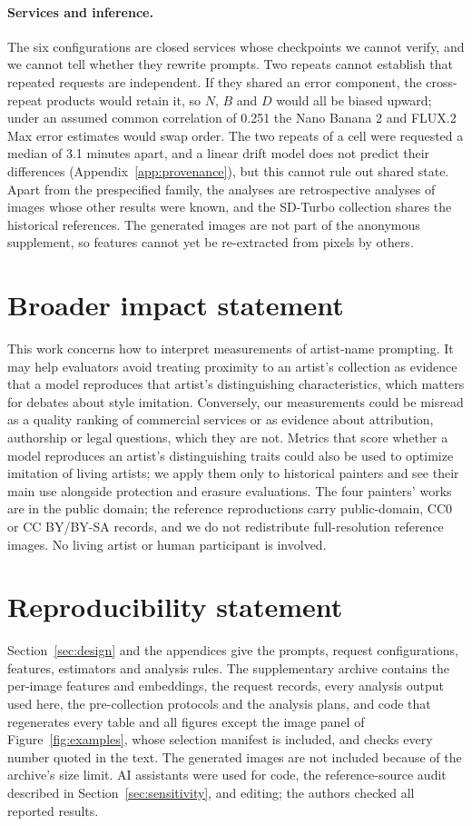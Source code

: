 \documentclass[10pt]{article}
\begin{document}
\paragraph{Services and inference.} The six configurations are closed services whose checkpoints
we cannot verify, and we cannot tell whether they rewrite prompts. Two repeats cannot establish that
repeated requests are independent. If they shared an error component, the cross-repeat products
would retain it, so $N$, $B$ and $D$ would all be biased upward; under an assumed common correlation
of 0.251 the Nano Banana 2 and FLUX.2 Max error estimates would swap order. The two repeats of a
cell were requested a median of 3.1 minutes apart, and a linear drift model does not predict their
differences (Appendix~\ref{app:provenance}), but this cannot rule out shared state. Apart from the
prespecified family, the analyses are retrospective analyses of images whose other results were
known, and the SD-Turbo collection shares the historical references. The generated images are not
part of the anonymous supplement, so features cannot yet be re-extracted from pixels by others.

\section*{Broader impact statement}
This work concerns how to interpret measurements of artist-name prompting. It may help evaluators
avoid treating proximity to an artist's collection as evidence that a model reproduces that artist's
distinguishing characteristics, which matters for debates about style imitation. Conversely, our
measurements could be misread as a quality ranking of commercial services or as evidence about
attribution, authorship or legal questions, which they are not. Metrics that score whether a model
reproduces an artist's distinguishing traits could also be used to optimize imitation of living
artists; we apply them only to historical painters and see their main use alongside protection
and erasure evaluations. The four painters' works are in the public domain; the reference
reproductions carry public-domain, CC0 or CC BY/BY-SA records, and we do not redistribute
full-resolution reference images. No living artist or human participant is involved.

\section*{Reproducibility statement}
Section~\ref{sec:design} and the appendices give the prompts, request configurations, features,
estimators and analysis rules. The supplementary archive contains the per-image features and
embeddings, the request records, every analysis output used here, the pre-collection protocols and
the analysis plans, and code that regenerates every table and all figures except the image panel of
Figure~\ref{fig:examples}, whose selection manifest is included, and checks every number quoted in
the text. The generated images are not included because of the archive's size limit. AI assistants
were used for code, the reference-source audit described in Section~\ref{sec:sensitivity}, and
editing; the authors checked all reported results.




\clearpage
\appendix

\end{document}
